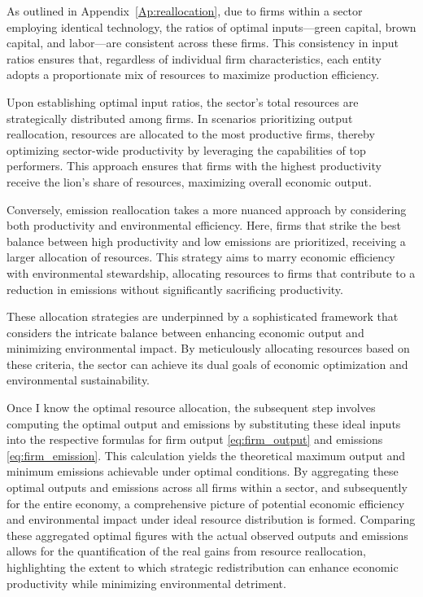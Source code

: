 As outlined in Appendix~\ref{Ap:reallocation}, due to firms within a sector employing identical technology, the ratios of optimal inputs—green capital, brown capital, and labor—are consistent across these firms. This consistency in input ratios ensures that, regardless of individual firm characteristics, each entity adopts a proportionate mix of resources to maximize production efficiency.


Upon establishing optimal input ratios, the sector's total resources are strategically distributed among firms. In scenarios prioritizing output reallocation, resources are allocated to the most productive firms, thereby optimizing sector-wide productivity by leveraging the capabilities of top performers. This approach ensures that firms with the highest productivity receive the lion's share of resources, maximizing overall economic output.


Conversely, emission reallocation takes a more nuanced approach by considering both productivity and environmental efficiency. Here, firms that strike the best balance between high productivity and low emissions are prioritized, receiving a larger allocation of resources. This strategy aims to marry economic efficiency with environmental stewardship, allocating resources to firms that contribute to a reduction in emissions without significantly sacrificing productivity.


These allocation strategies are underpinned by a sophisticated framework that considers the intricate balance between enhancing economic output and minimizing environmental impact. By meticulously allocating resources based on these criteria, the sector can achieve its dual goals of economic optimization and environmental sustainability.

Once I know the optimal resource allocation, the subsequent step involves computing the optimal output and emissions by substituting these ideal inputs into the respective formulas for firm output \eqref{eq:firm_output} and emissions \eqref{eq:firm_emission}. This calculation yields the theoretical maximum output and minimum emissions achievable under optimal conditions. By aggregating these optimal outputs and emissions across all firms within a sector, and subsequently for the entire economy, a comprehensive picture of potential economic efficiency and environmental impact under ideal resource distribution is formed. Comparing these aggregated optimal figures with the actual observed outputs and emissions allows for the quantification of the real gains from resource reallocation, highlighting the extent to which strategic redistribution can enhance economic productivity while minimizing environmental detriment. 

\bigskip